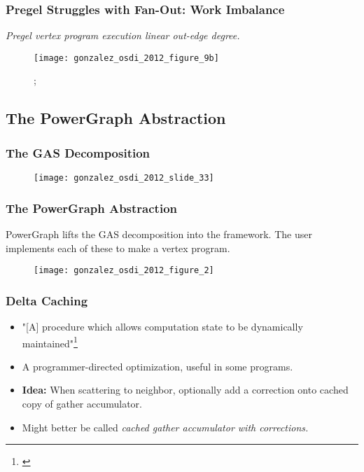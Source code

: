 \begin{frame}
  \frametitle{Pregel Struggles with Fan-Out: Work Imbalance}
  \centering
  \large
  \textit{Pregel vertex program execution linear out-edge degree.}

  \begin{figure}
    \texttt{[image: gonzalez\_osdi\_2012\_figure\_9b]}
    \caption{\cite[OSDI '12 Slides]{gonzalez2012powergraph-slides};
    \cite[OSDI '12]{gonzalez2012powergraph}}
  \end{figure}
\end{frame}

\subsection{The PowerGraph Abstraction}

\begin{frame}
  \frametitle{The GAS Decomposition}
  \begin{figure}
    \centering
    \texttt{[image: gonzalez\_osdi\_2012\_slide\_33]}
    \caption{\cite[OSDI '12 Slides]{gonzalez2012powergraph-slides}}
  \end{figure}
\end{frame}

\begin{frame}
  \frametitle{The PowerGraph Abstraction}
  PowerGraph lifts the GAS decomposition into the framework. The user implements
  each of these to make a vertex program.
  \begin{figure}
    \centering
    \texttt{[image: gonzalez\_osdi\_2012\_figure\_2]}
    \caption{\cite[OSDI '12]{gonzalez2012powergraph}}
  \end{figure}
\end{frame}

\begin{frame}
  \frametitle{Delta Caching}
  \begin{itemize}
    \item "[A] procedure which allows computation state to be dynamically
          maintained"\footnote{\cite[OSDI '12]{gonzalez2012powergraph}}
    \item A programmer-directed optimization, useful in some programs.
    \item \textbf{Idea:} When scattering to neighbor, optionally add a
          correction onto cached copy of gather accumulator.
    \item Might better be called \textit{cached gather accumulator with
          corrections.}
  \end{itemize}
\end{frame}

